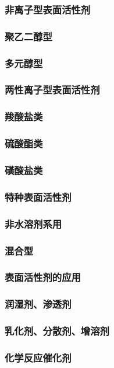 \documentclass[UTF8]{../../ApplicationUniverse}
\begin{document}
    \subsubsection{非离子型表面活性剂}
        \subsubsection{聚乙二醇型}
        \subsubsection{多元醇型}
    \subsubsection{两性离子型表面活性剂}
        \subsubsection{羧酸盐类}
        \subsubsection{硫酸酯类}
        \subsubsection{磺酸盐类}
    \subsubsection{特种表面活性剂}
        \subsubsection{非水溶剂系用}
        \subsubsection{混合型}
    \subsubsection{表面活性剂的应用}
        \subsubsection{润湿剂、渗透剂}
        \subsubsection{乳化剂、分散剂、增溶剂}
        \subsubsection{化学反应催化剂}
\end{document}
